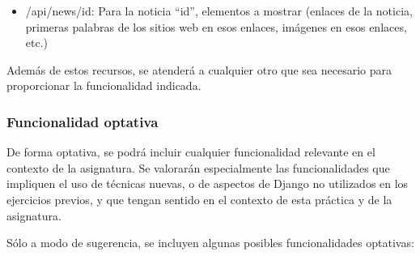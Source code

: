 \begin{itemize}
\item /api/news/id: Para la noticia ``id'', elementos a mostrar (enlaces de la noticia, primeras palabras de los sitios web en esos enlaces, imágenes en esos enlaces, etc.)
\end{itemize}

Además de estos recursos, se atenderá a cualquier otro que sea necesario para proporcionar la funcionalidad indicada.


\subsubsection{Funcionalidad optativa}

De forma optativa, se podrá incluir cualquier funcionalidad relevante en el contexto de la asignatura. Se valorarán especialmente las funcionalidades que impliquen el uso de técnicas nuevas, o de aspectos de Django no utilizados en los ejercicios previos, y que tengan sentido en el contexto de esta práctica y de la asignatura.

Sólo a modo de sugerencia, se incluyen algunas posibles funcionalidades optativas:

